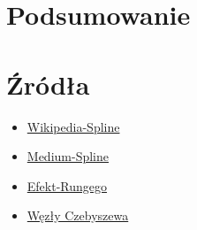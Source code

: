 \documentclass{article}
\begin{document}
\section{Podsumowanie}
\section{Źródła}
\begin{itemize}
	\item \href{https://en.wikipedia.org/w/index.php?title=Spline_%28mathematics%29&oldid=288288033#Algorithm_for_computing_natural_cubic_splines}{Wikipedia-Spline}
	\item \href{https://medium.com/eatpredlove/natural-cubic-splines-implementation-with-python-edf68feb57aa}{Medium-Spline}
	\item \href{https://pl.wikipedia.org/wiki/Efekt_Rungego}{Efekt-Rungego}
	\item \href{https://byc-matematykiem.pl/tajniki-interpolacji-czesc-9/}{Węzły Czebyszewa}
\end{itemize}
\end{document}
